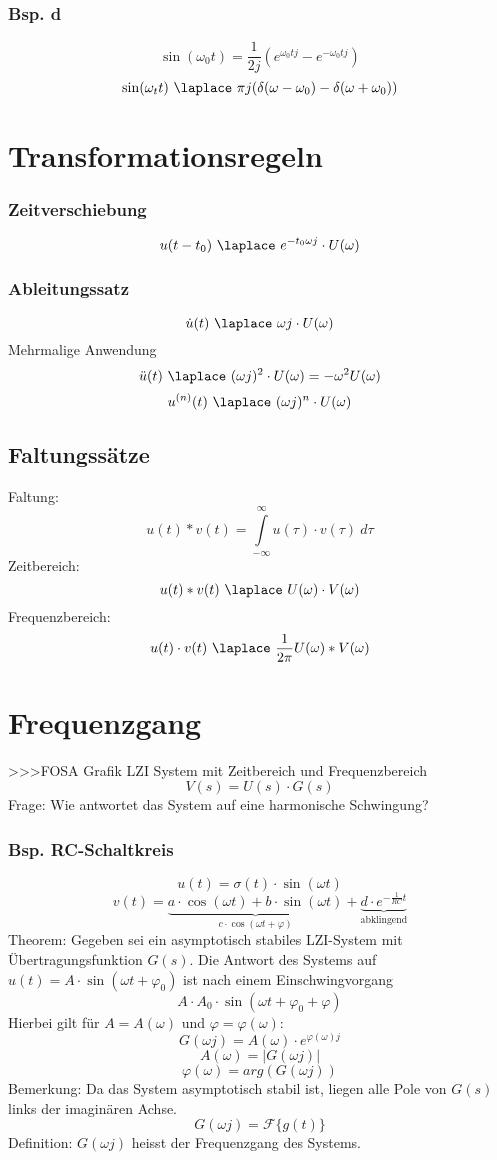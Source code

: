 \subsubsection{Bsp. d}
\[ \sin(\omega_0 t) = \frac{1}{2 j} (e^{\omega_0 t j} - e^{-\omega_0 t j}) \]
\[ \sin(\omega_t t) ~ \laplace 
~ \pi j (\delta(\omega - \omega_0) - \delta(\omega + \omega_0)) \]

\section{Transformationsregeln}
\subsubsection{Zeitverschiebung}
\[ u(t - t_0) ~ \laplace ~ e^{-t_0 \omega j} \cdot U(\omega) \]
\subsubsection{Ableitungssatz}
\[ \dot{u}(t) ~ \laplace ~ \omega j \cdot U(\omega) \]
Mehrmalige Anwendung
\[ \ddot{u}(t) ~ \laplace ~ (\omega j)^2 \cdot U(\omega) = -\omega^2 U(\omega) \]
\[ u^{(n)}(t) ~ \laplace ~ (\omega j)^n \cdot U(\omega) \]

\subsection{Faltungssätze}
Faltung: 
\[u(t) * v(t) = \int\limits_{-\infty}^{\infty} u(\tau) \cdot v(\tau) ~ d \tau  \]
Zeitbereich: 
\[ u(t) * v(t) ~ \laplace ~ U(\omega) \cdot V(\omega) \]
Frequenzbereich:
\[ u(t) \cdot v(t) ~ \laplace ~ \frac{1}{2 \pi} U(\omega) * V(\omega) \]

\section{Frequenzgang}
>>>FOSA Grafik LZI System mit Zeitbereich und Frequenzbereich
\[ V(s) = U(s) \cdot G(s) \]
Frage: Wie antwortet das System auf eine harmonische Schwingung? 
\subsubsection{Bsp. RC-Schaltkreis}
\[ u(t) = \sigma(t) \cdot \sin(\omega t) \]
\[ v(t) = \underbrace{a \cdot \cos(\omega t) + b \cdot \sin(\omega t)}_
{c \cdot \cos(\omega t + \varphi)} + \underbrace{d \cdot e^{-\frac{1}{R C}t}}_
{\text{abklingend}} \]
Theorem: Gegeben sei ein asymptotisch stabiles LZI-System mit Übertragungsfunktion 
$G(s)$. Die Antwort des Systems auf $u(t) = A \cdot \sin(\omega t + \varphi_0)$
ist nach einem Einschwingvorgang  
\[ A \cdot A_0 \cdot \sin(\omega t + \varphi_0 + \varphi) \]
Hierbei gilt für $A = A(\omega)$ und $\varphi = \varphi(\omega)$: 
\[ G(\omega j) = A(\omega) \cdot e^{\varphi(\omega) j} \]
\[ A(\omega) = |G(\omega j)| \]
\[ \varphi(\omega) = arg(G(\omega j)) \]
Bemerkung: Da das System asymptotisch stabil ist, liegen alle Pole von $G(s)$ 
links der imaginären Achse. 
\[ G(\omega j) = \mathcal{F}\{ g(t) \} \]
Definition: $G(\omega j)$ heisst der Frequenzgang des Systems. 

